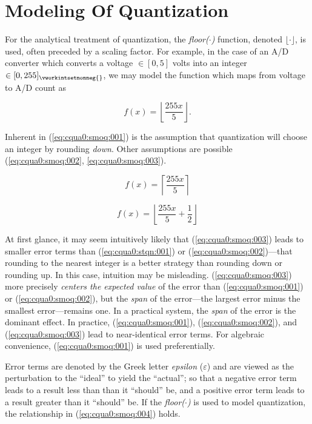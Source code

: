 \section{Modeling Of Quantization}

For the analytical treatment of quantization, the \emph{floor($\cdot{}$)}
function, denoted $\lfloor \cdot \rfloor$, is used, often preceded by a
scaling factor.  For example, in the case of an A/D converter which
converts a voltage $\in [0, 5]$ volts into an integer
$\in [0,255]_{\vworkintsetnonneg{}}$, we may model the function which
maps from voltage to A/D count as

\begin{equation}
\label{eq:cqua0:smoq:001}
f(x) = \left\lfloor {\frac{255 x }{5}} \right\rfloor .
\end{equation}

Inherent in (\ref{eq:cqua0:smoq:001})
is the assumption that quantization will
choose an integer by rounding \emph{down}.  Other
assumptions are possible
(\ref{eq:cqua0:smoq:002}, \ref{eq:cqua0:smoq:003}).

\begin{equation}
\label{eq:cqua0:smoq:002}
f(x) = \left\lceil {\frac{255 x }{5}} \right\rceil
\end{equation}

\begin{equation}
\label{eq:cqua0:smoq:003}
f(x) = \left\lfloor {\frac{255 x }{5} + \frac{1}{2}} \right\rfloor
\end{equation}

At first glance, it may seem intuitively likely
that (\ref{eq:cqua0:smoq:003}) leads
to smaller error terms than (\ref{eq:cqua0:stqn:001})
or (\ref{eq:cqua0:smoq:002})---that rounding to the
nearest integer is a better strategy than rounding
down or rounding up.  In this case, intuition may be misleading.
(\ref{eq:cqua0:smoq:003}) more precisely \emph{centers the
expected value} of the error than (\ref{eq:cqua0:smoq:001})
or (\ref{eq:cqua0:smoq:002}), but the \emph{span} of the
error---the largest error minus the smallest error---remains
one.  In a practical system, the \emph{span} of the error
is the dominant effect.  In practice,
(\ref{eq:cqua0:smoq:001}), (\ref{eq:cqua0:smoq:002}),
and (\ref{eq:cqua0:smoq:003}) lead to near-identical
error terms.  For algebraic convenience,
(\ref{eq:cqua0:smoq:001}) is used preferentially.

Error terms are denoted by the Greek
letter \emph{epsilon} ($\varepsilon$) and
are viewed as the perturbation to the
``ideal'' to yield the ``actual''; so that a negative error
term leads to a result less than than it
``should'' be, and a positive
error term leads to a result greater than
it ``should'' be.  If the \emph{floor($\cdot{}$)}
is used to model quantization, the relationship
in (\ref{eq:cqua0:smoq:004}) holds.

